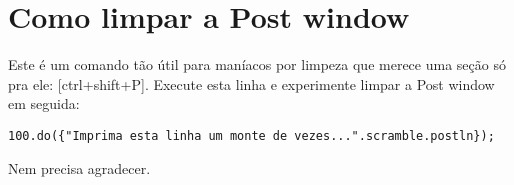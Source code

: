 \section{Como limpar a Post window}

Este é um comando tão útil para maníacos por limpeza que merece uma seção só pra ele: [ctrl+shift+P]. Execute esta linha e experimente limpar a Post window em seguida:

 
\begin{lstlisting}[style=SuperCollider-IDE, basicstyle=\scttfamily\footnotesize]
100.do({"Imprima esta linha um monte de vezes...".scramble.postln});
\end{lstlisting}
 
Nem precisa agradecer.

